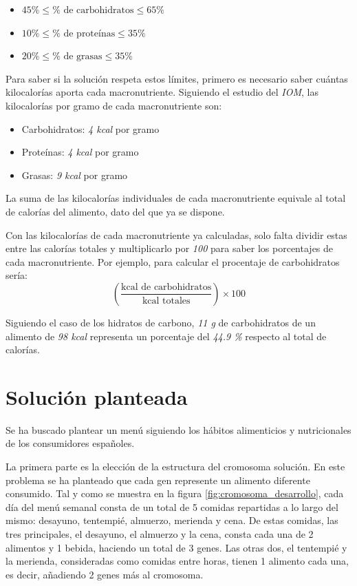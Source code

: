 \begin{itemize}
    \item $45\% \leq \% \text{ de carbohidratos} \leq 65\%$
    \item $10\% \leq \% \text{ de proteínas} \leq 35\%$
    \item $20\% \leq \% \text{ de grasas} \leq 35\%$
\end{itemize}

Para saber si la solución respeta estos límites, primero es necesario saber cuántas kilocalorías aporta cada macronutriente. Siguiendo el estudio del \textit{IOM}, las kilocalorías por gramo de cada macronutriente son:
\newpage
\begin{itemize}
    \item Carbohidratos: \textit{4 kcal} por gramo
    \item Proteínas: \textit{4 kcal} por gramo
    \item Grasas: \textit{9 kcal} por gramo
\end{itemize}

La suma de las kilocalorías individuales de cada macronutriente equivale al total de calorías del alimento, dato del que ya se dispone.

Con las kilocalorías de cada macronutriente ya calculadas, solo falta dividir estas entre las calorías totales y multiplicarlo por \textit{100} para saber los porcentajes de cada macronutriente. Por ejemplo, para calcular el procentaje de carbohidratos sería:
\[
\left( \frac{\text{kcal de carbohidratos}}{\text{kcal totales}} \right) \times 100
\]

Siguiendo el caso de los hidratos de carbono, \textit{11 g} de carbohidratos de un alimento de \textit{98 kcal} representa un porcentaje del \textit{44.9 \%} respecto al total de calorías.


\section{Solución planteada}
\label{ch:solucion-planteada}

Se ha buscado plantear un menú siguiendo los hábitos alimenticios y nutricionales de los consumidores españoles.

La primera parte es la elección de la estructura del cromosoma solución. En este problema se ha planteado que cada gen represente un alimento diferente consumido. Tal y como se muestra en la figura \ref{fig:cromosoma_desarrollo}, cada día del menú semanal consta de un total de 5 comidas repartidas a lo largo del mismo: desayuno, tentempié, almuerzo, merienda y cena. De estas comidas, las tres principales, el desayuno, el almuerzo y la cena, consta cada una de 2 alimentos y 1 bebida, haciendo un total de 3 genes. Las otras dos, el tentempié y la merienda, consideradas como comidas entre horas, tienen 1 alimento cada una, es decir, añadiendo 2 genes más al cromosoma.

